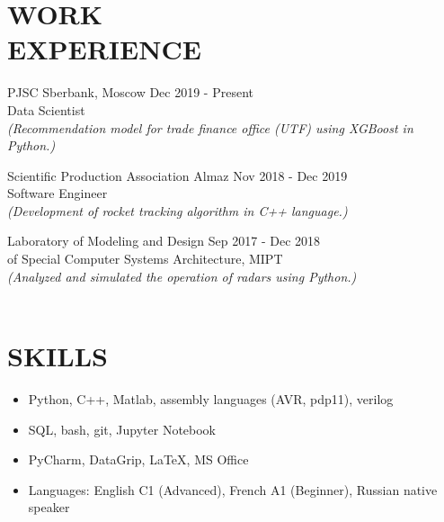 \documentclass[margin, 10pt]{res} %
\begin{document}
\begin{resume}
\section{WORK \\ EXPERIENCE} 
PJSC Sberbank, Moscow \hfill
Dec 2019 - Present \\
Data Scientist \\
{\sl (Recommendation model for trade finance office (UTF) using XGBoost in Python.)}

Scientific Production Association Almaz \hfill Nov 2018 - Dec 2019 \\
Software Engineer \\
{\sl (Development of rocket tracking algorithm in C++ language.)}

 Laboratory of Modeling and Design \hfill Sep 2017 - Dec 2018 \\
of Special Computer Systems Architecture, MIPT\\
{\sl (Analyzed and simulated the operation of radars using Python.)}\\
\\

 
 \section{SKILLS} 

\begin{itemize}
\item Python, C++, Matlab, assembly languages (AVR, pdp11), verilog
\item SQL, bash, git, Jupyter Notebook%
\item PyCharm, DataGrip, \LaTeX, MS Office
\item Languages: English C1 (Advanced), French A1 (Beginner), Russian native speaker
\end{itemize} 


\end{resume}
\end{document}
